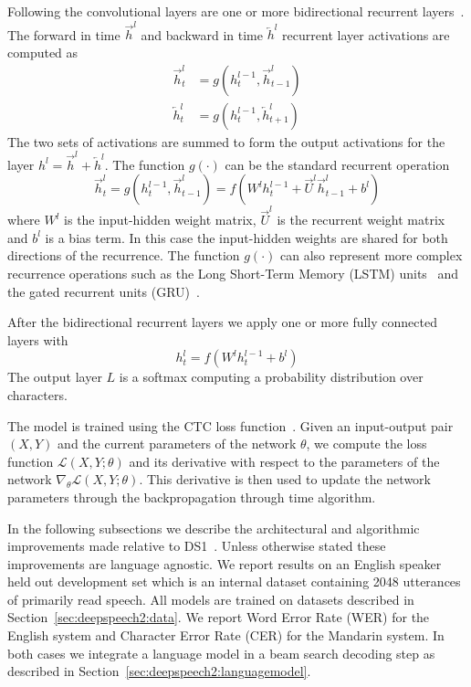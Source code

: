 Following the convolutional layers are one or more bidirectional recurrent
layers~\cite{schuster1997bidirectional}. The forward in time
$\overrightarrow{h}^l$ and backward in time $\overleftarrow{h}^l$ recurrent
layer activations are computed as
\begin{equation*}
\begin{aligned}
    \overrightarrow{h}_t^l &= g( h_t^{l-1}, \overrightarrow{h}_{t-1}^l ) \\
    \overleftarrow{h}_t^l &= g( h_t^{l-1}, \overleftarrow{h}_{t+1}^l )
\end{aligned}
\end{equation*}
The two sets of activations are summed to form the output activations for the
layer $h^l = \overrightarrow{h}^l + \overleftarrow{h}^l$.  The function
$g(\cdot)$ can be the standard recurrent operation
\begin{equation}
    \overrightarrow{h}_t^l = g( h_t^{l-1}, \overrightarrow{h}_{t-1}^l )
        = f( W^l h_t^{l-1} + \overrightarrow{U}^l \overrightarrow{h}_{t-1}^l + b^l )
    \label{eq:deepspeech2:plainrnn}
\end{equation}
where $W^l$ is the input-hidden weight matrix, $\overrightarrow{U}^l$ is the
recurrent weight matrix and $b^l$ is a bias term. In this case the input-hidden
weights are shared for both directions of the recurrence. The function
$g(\cdot)$ can also represent more complex recurrence operations such as the
Long Short-Term Memory (LSTM) units~\cite{hochreiter1997} and the gated
recurrent units (GRU)~\cite{cho2014}.

After the bidirectional recurrent layers we apply one or more fully connected layers with
\begin{equation*}
    h^l_t = f( W^l h^{l-1}_t + b^l )
\end{equation*}
The output layer $L$ is a softmax computing a probability distribution over
characters.

The model is trained using the CTC loss function~\cite{graves2006}. Given an
input-output pair $(X, Y)$ and the current parameters of the network $\theta$,
we compute the loss function $\mathcal{L}(X, Y; \theta)$ and its derivative
with respect to the parameters of the network $\nabla_\theta \mathcal{L}(X, Y;
\theta)$. This derivative is then used to update the network parameters through
the backpropagation through time algorithm.

In the following subsections we describe the architectural and algorithmic
improvements made relative to DS1~\cite{hannun2014deepspeech}.  Unless
otherwise stated these improvements are language agnostic. We report results on
an English speaker held out development set which is an internal dataset
containing 2048 utterances of primarily read speech. All models are trained on
datasets described in Section~\ref{sec:deepspeech2:data}. We report Word Error
Rate (WER) for the English system and Character Error Rate (CER) for the
Mandarin system. In both cases we integrate a language model in a beam search
decoding step as described in Section~\ref{sec:deepspeech2:languagemodel}.


